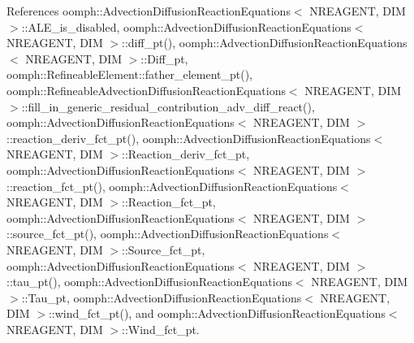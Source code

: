 References oomph\+::\+Advection\+Diffusion\+Reaction\+Equations$<$ N\+R\+E\+A\+G\+E\+N\+T, D\+I\+M $>$\+::\+A\+L\+E\+\_\+is\+\_\+disabled, oomph\+::\+Advection\+Diffusion\+Reaction\+Equations$<$ N\+R\+E\+A\+G\+E\+N\+T, D\+I\+M $>$\+::diff\+\_\+pt(), oomph\+::\+Advection\+Diffusion\+Reaction\+Equations$<$ N\+R\+E\+A\+G\+E\+N\+T, D\+I\+M $>$\+::\+Diff\+\_\+pt, oomph\+::\+Refineable\+Element\+::father\+\_\+element\+\_\+pt(), oomph\+::\+Refineable\+Advection\+Diffusion\+Reaction\+Equations$<$ N\+R\+E\+A\+G\+E\+N\+T, D\+I\+M $>$\+::fill\+\_\+in\+\_\+generic\+\_\+residual\+\_\+contribution\+\_\+adv\+\_\+diff\+\_\+react(), oomph\+::\+Advection\+Diffusion\+Reaction\+Equations$<$ N\+R\+E\+A\+G\+E\+N\+T, D\+I\+M $>$\+::reaction\+\_\+deriv\+\_\+fct\+\_\+pt(), oomph\+::\+Advection\+Diffusion\+Reaction\+Equations$<$ N\+R\+E\+A\+G\+E\+N\+T, D\+I\+M $>$\+::\+Reaction\+\_\+deriv\+\_\+fct\+\_\+pt, oomph\+::\+Advection\+Diffusion\+Reaction\+Equations$<$ N\+R\+E\+A\+G\+E\+N\+T, D\+I\+M $>$\+::reaction\+\_\+fct\+\_\+pt(), oomph\+::\+Advection\+Diffusion\+Reaction\+Equations$<$ N\+R\+E\+A\+G\+E\+N\+T, D\+I\+M $>$\+::\+Reaction\+\_\+fct\+\_\+pt, oomph\+::\+Advection\+Diffusion\+Reaction\+Equations$<$ N\+R\+E\+A\+G\+E\+N\+T, D\+I\+M $>$\+::source\+\_\+fct\+\_\+pt(), oomph\+::\+Advection\+Diffusion\+Reaction\+Equations$<$ N\+R\+E\+A\+G\+E\+N\+T, D\+I\+M $>$\+::\+Source\+\_\+fct\+\_\+pt, oomph\+::\+Advection\+Diffusion\+Reaction\+Equations$<$ N\+R\+E\+A\+G\+E\+N\+T, D\+I\+M $>$\+::tau\+\_\+pt(), oomph\+::\+Advection\+Diffusion\+Reaction\+Equations$<$ N\+R\+E\+A\+G\+E\+N\+T, D\+I\+M $>$\+::\+Tau\+\_\+pt, oomph\+::\+Advection\+Diffusion\+Reaction\+Equations$<$ N\+R\+E\+A\+G\+E\+N\+T, D\+I\+M $>$\+::wind\+\_\+fct\+\_\+pt(), and oomph\+::\+Advection\+Diffusion\+Reaction\+Equations$<$ N\+R\+E\+A\+G\+E\+N\+T, D\+I\+M $>$\+::\+Wind\+\_\+fct\+\_\+pt.

\mbox{\label{classoomph_1_1RefineableAdvectionDiffusionReactionEquations_ab68dd4feee2b6e4d268e464686254199}} 
